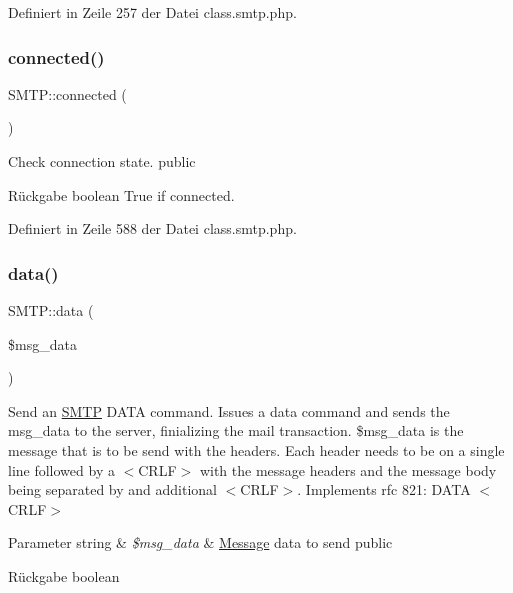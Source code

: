 Definiert in Zeile 257 der Datei class.\+smtp.\+php.

\mbox{\label{class_s_m_t_p_a36ba343057efdbb7bec92a37539b8c8d}} 
\subsubsection{\texorpdfstring{connected()}{connected()}}
{\footnotesize\ttfamily S\+M\+T\+P\+::connected (\begin{DoxyParamCaption}{ }\end{DoxyParamCaption})}

Check connection state.  public \begin{DoxyReturn}{Rückgabe}
boolean True if connected. 
\end{DoxyReturn}


Definiert in Zeile 588 der Datei class.\+smtp.\+php.

\mbox{\label{class_s_m_t_p_ae5ae69f15530c34b0d40db955a83679c}} 
\subsubsection{\texorpdfstring{data()}{data()}}
{\footnotesize\ttfamily S\+M\+T\+P\+::data (\begin{DoxyParamCaption}\item[{}]{\$msg\+\_\+data }\end{DoxyParamCaption})}

Send an \mbox{\hyperlink{class_s_m_t_p}{S\+M\+TP}} D\+A\+TA command. Issues a data command and sends the msg\+\_\+data to the server, finializing the mail transaction. \$msg\+\_\+data is the message that is to be send with the headers. Each header needs to be on a single line followed by a $<$\+C\+R\+L\+F$>$ with the message headers and the message body being separated by and additional $<$\+C\+R\+L\+F$>$. Implements rfc 821\+: D\+A\+TA $<$\+C\+R\+L\+F$>$ 
\begin{DoxyParams}[1]{Parameter}
string & {\em \$msg\+\_\+data} & \mbox{\hyperlink{class_message}{Message}} data to send  public \\
\hline
\end{DoxyParams}
\begin{DoxyReturn}{Rückgabe}
boolean 
\end{DoxyReturn}


